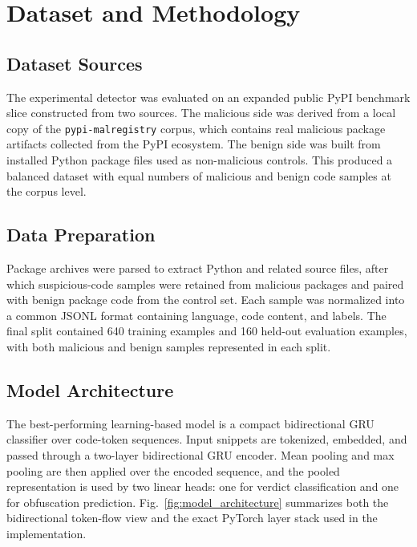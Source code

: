 \documentclass[conference]{IEEEtran}
\begin{document}
\section{Dataset and Methodology}
\subsection{Dataset Sources}
The experimental detector was evaluated on an expanded public PyPI benchmark slice constructed from two sources. The malicious side was derived from a local copy of the \texttt{pypi-malregistry} corpus, which contains real malicious package artifacts collected from the PyPI ecosystem. The benign side was built from installed Python package files used as non-malicious controls. This produced a balanced dataset with equal numbers of malicious and benign code samples at the corpus level.

\subsection{Data Preparation}
Package archives were parsed to extract Python and related source files, after which suspicious-code samples were retained from malicious packages and paired with benign package code from the control set. Each sample was normalized into a common JSONL format containing language, code content, and labels. The final split contained 640 training examples and 160 held-out evaluation examples, with both malicious and benign samples represented in each split.

\subsection{Model Architecture}
The best-performing learning-based model is a compact bidirectional GRU classifier over code-token sequences. Input snippets are tokenized, embedded, and passed through a two-layer bidirectional GRU encoder. Mean pooling and max pooling are then applied over the encoded sequence, and the pooled representation is used by two linear heads: one for verdict classification and one for obfuscation prediction. Fig.~\ref{fig:model_architecture} summarizes both the bidirectional token-flow view and the exact PyTorch layer stack used in the implementation.
\end{document}
